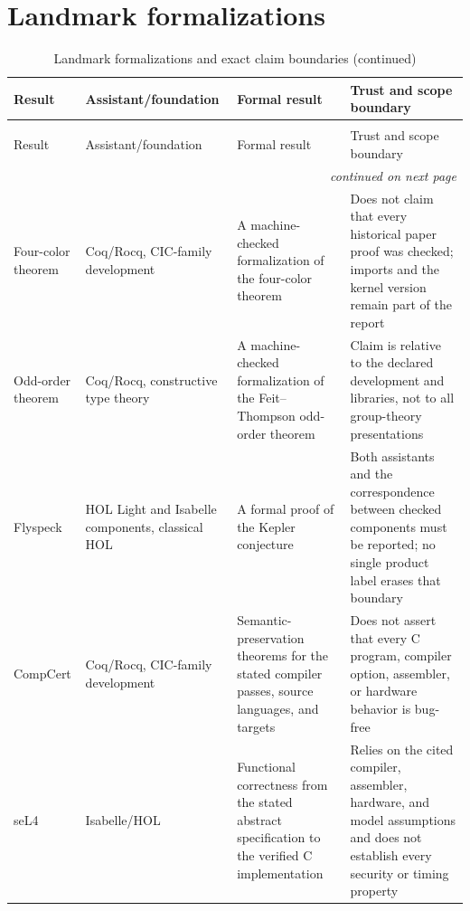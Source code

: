 \section{Landmark formalizations}

\begin{landscape}
\thispagestyle{plain}
\begingroup\scriptsize
\setlength{\tabcolsep}{3pt}
\begin{longtable}{@{}p{1.05in}p{1.20in}p{2.10in}p{2.75in}@{}}
\caption{Landmark formalizations and exact claim boundaries.}
\label{tab:p12-landmark-formalizations}\\
\toprule
Result & Assistant/foundation & Formal result & Trust and scope boundary \\
\midrule
\endfirsthead
\caption[]{Landmark formalizations and exact claim boundaries (continued)}\\
\toprule
Result & Assistant/foundation & Formal result & Trust and scope boundary \\
\midrule
\endhead
\midrule\multicolumn{4}{r}{\emph{continued on next page}}\\
\endfoot
\endlastfoot
Four-color theorem & Coq/Rocq, CIC-family development & A machine-checked
formalization of the four-color theorem & Does not claim that every historical
paper proof was checked; imports and the kernel version remain part of the
report \cite{Gonthier2008} \\ \addlinespace
Odd-order theorem & Coq/Rocq, constructive type theory & A machine-checked
formalization of the Feit--Thompson odd-order theorem & Claim is relative to the
declared development and libraries, not to all group-theory presentations
\cite{GonthierEtAl2013} \\ \addlinespace
Flyspeck & HOL Light and Isabelle components, classical HOL & A formal proof of
the Kepler conjecture & Both assistants and the correspondence between checked
components must be reported; no single product label erases that boundary
\cite{HalesEtAl2017} \\ \addlinespace
CompCert & Coq/Rocq, CIC-family development & Semantic-preservation theorems
for the stated compiler passes, source languages, and targets & Does not assert
that every C program, compiler option, assembler, or hardware behavior is
bug-free \cite{Leroy2009} \\ \addlinespace
seL4 & Isabelle/HOL & Functional correctness from the stated abstract
specification to the verified C implementation & Relies on the cited compiler,
assembler, hardware, and model assumptions and does not establish every
security or timing property \cite{KleinEtAl2009} \\
\bottomrule
\end{longtable}
\endgroup
\end{landscape}

